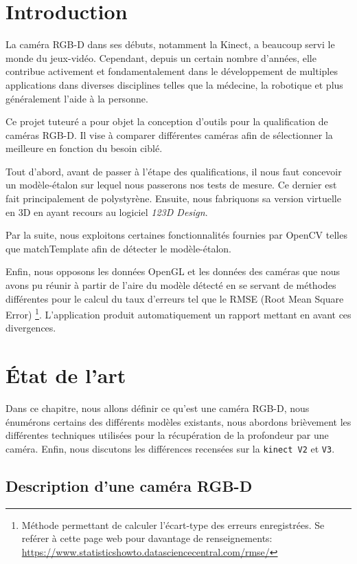 \documentclass[a4paper, 12pt]{book}
\begin{document}
\chapter*{Introduction}
La caméra RGB-D dans ses débuts, notamment la Kinect, a beaucoup
servi le monde du jeux-vidéo. Cependant, depuis un certain nombre d'années, elle contribue activement et fondamentalement dans le développement
de multiples applications dans diverses disciplines telles que la médecine, la
robotique et plus généralement l'aide à la personne.
\par Ce projet tuteuré a pour objet la conception d'outils pour la qualification de caméras RGB-D. Il vise à comparer différentes caméras afin de sélectionner la meilleure en
fonction du besoin ciblé.
\par Tout d'abord, avant de passer à l'étape des qualifications,  il nous faut concevoir un modèle-étalon sur lequel nous passerons nos tests de mesure. Ce dernier est fait principalement de polystyrène. Ensuite,   nous fabriquons sa version virtuelle en 3D en ayant recours au logiciel \emph{123D Design}.
\par Par la suite, nous exploitons certaines fonctionnalités fournies par OpenCV telles que matchTemplate afin de détecter le modèle-étalon.
\par Enfin, nous opposons les données OpenGL et les données des caméras que nous avons pu réunir à partir de l'aire du modèle détecté en se servant de méthodes différentes pour le calcul du taux d'erreurs tel que le RMSE (Root Mean Square Error) \footnote{Méthode permettant de calculer l'écart-type des erreurs enregistrées. Se reférer à cette page web pour davantage de renseignements: \url{https://www.statisticshowto.datasciencecentral.com/rmse/}}. L'application produit automatiquement un rapport mettant en avant ces divergences.

\chapter{État de l'art}

Dans ce chapitre, nous allons définir ce qu'est une caméra RGB-D, nous énumérons certains des différents modèles existants, nous abordons brièvement les différentes techniques utilisées pour la récupération de la profondeur par une caméra. Enfin, nous discutons les différences recensées sur la \texttt{kinect V2} et \texttt{V3}.

\section{Description d'une caméra RGB-D}
\end{document}
